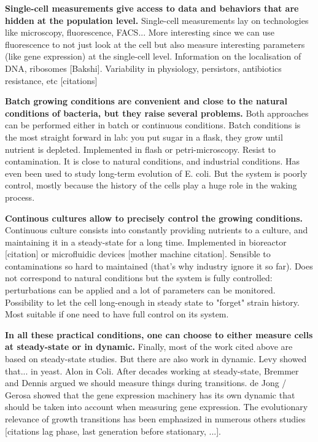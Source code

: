 \textbf{Single-cell measurements give access to data and behaviors that are hidden at the population level.}
Single-cell measurements lay on technologies like microscopy, fluorescence, FACS...
More interesting since we can use fluorescence to not just look at the cell but also measure interesting parameters (like gene expression) at the single-cell level.
Information on the localisation of DNA, ribosomes [Bakshi].
Variability in physiology, persistors, antibiotics resistance, etc [citations]

\textbf{Batch growing conditions are convenient and close to the natural conditions of bacteria, but they raise several problems.}
Both approaches can be performed either in batch or continuous conditions.
Batch conditions is the most straight forward in lab: you put sugar in a flask, they grow until nutrient is depleted.
Implemented in flash or petri-microscopy.
Resist to contamination.
It is close to natural conditions, and industrial conditions.
Has even been used to study long-term evolution of E. coli.
But the system is poorly control, mostly because the history of the cells play a huge role in the waking process.

\textbf{Continous cultures allow to precisely control the growing conditions.}
Continuous culture consists into constantly providing nutrients to a culture, and maintaining it in a steady-state for a long time.
Implemented in bioreactor [citation] or microfluidic devices [mother machine citation].
Sensible to contaminations so hard to maintained (that's why industry ignore it so far).
Does not correspond to natural conditions but the system is fully controlled: perturbations can be applied and a lot of parameters can be monitored.
Possibility to let the cell long-enough in steady state to "forget" strain history.
Most suitable if one need to have full control on its system.

\textbf{In all these practical conditions, one can choose to either measure cells at steady-state or in dynamic.}
Finally, most of the work cited above are based on steady-state studies.
But there are also work in dynamic.
Levy showed that... in yeast.
Alon in Coli.
After decades working at steady-state, Bremmer and Dennis argued we should measure things during transitions.
de Jong / Gerosa showed that the gene expression machinery has its own dynamic that should be taken into account when measuring gene expression.
The evolutionary relevance of growth transitions has been emphasized in numerous others studies [citations lag phase, last generation before stationary, ...].

